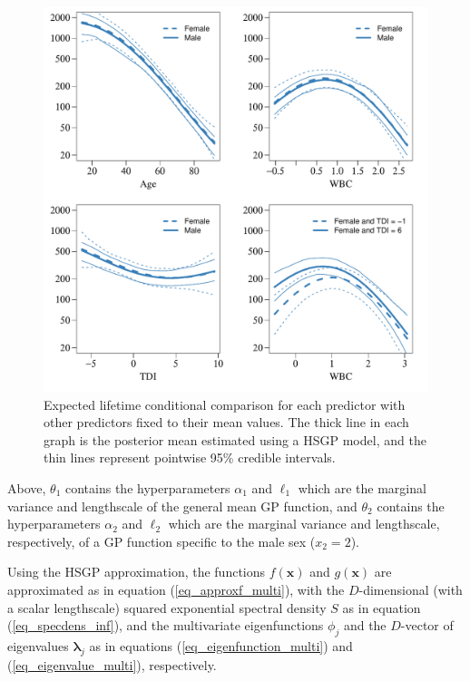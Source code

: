 \documentclass[onecolumn,a4paper,11pt]{article}
\begin{document}
\begin{figure}
\centering
\includegraphics[scale=0.70, trim = 0mm 0mm 0mm 0mm, clip]{ch5_fig21_posteriors_leukemia_02.pdf}
\caption{Expected lifetime conditional comparison for each predictor with other predictors fixed to their mean values. The thick line in each graph is the posterior mean estimated using a HSGP model, and the thin lines represent pointwise 95\% credible intervals.}
  \label{ch5_fig21_posteriors_leukemia}
\end{figure}
Above, $\theta_1$ contains the hyperparameters $\alpha_1$ and $\ell_1$ which are the marginal variance and lengthscale of the general mean GP function, and $\theta_2$ contains the hyperparameters $\alpha_2$ and $\ell_2$ which are the marginal variance and lengthscale, respectively, of a GP function specific to the male sex ($x_2=2$).

Using the HSGP approximation, the functions $f(\bm{x})$ and $g(\bm{x})$ are approximated as in equation (\ref{eq_approxf_multi}), with the $D$-dimensional (with a scalar lengthscale) squared exponential spectral density $S$ as in equation (\ref{eq_specdens_inf}), and the multivariate eigenfunctions $\phi_j$ and the $D$-vector of eigenvalues $\bm{\lambda}_j$ as in equations (\ref{eq_eigenfunction_multi}) and  (\ref{eq_eigenvalue_multi}), respectively.
\end{document}
